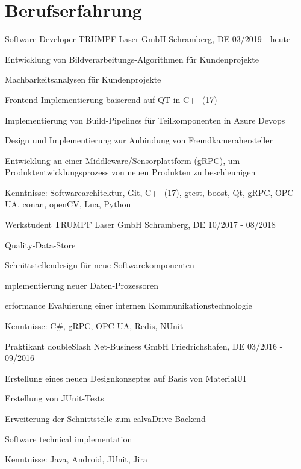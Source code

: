 \vspace{-\acvSectionTopSkip}
\section{Berufserfahrung}
\cventry
{Software-Developer} %
{TRUMPF Laser GmbH} %
{Schramberg, DE} %
{03/2019 - heute} %
\begin{cvitems}
\item {Entwicklung von Bildverarbeitungs-Algorithmen für Kundenprojekte}
\item {Machbarkeitsanalysen für Kundenprojekte}
\item {Frontend-Implementierung baiserend auf QT in C++(17)}
\item {Implementierung von Build-Pipelines für Teilkomponenten in Azure Devops}
\item {Design und Implementierung zur Anbindung von Fremdkamerahersteller}
\item {Entwicklung an einer Middleware/Sensorplattform (gRPC), um Produktentwicklungsprozess von neuen Produkten zu beschleunigen}
\item{Kenntnisse: Softwarearchitektur, Git, C++(17), gtest, boost, Qt, gRPC, OPC-UA, conan, openCV, Lua, Python }
\end{cvitems}

\cventry
{Werkstudent} %
{TRUMPF Laser GmbH} %
{Schramberg, DE} %
{10/2017 - 08/2018} %
\begin{cvitems}
\item {Quality-Data-Store}
\item {Schnittstellendesign für neue Softwarekomponenten}
\item {mplementierung neuer Daten-Prozessoren}
\item {erformance Evaluierung einer internen Kommunikationstechnologie}
\item{Kenntnisse: C\#, gRPC, OPC-UA, Redis, NUnit}
\end{cvitems}

\cventry
{Praktikant} %
{doubleSlash Net-Business GmbH} %
{Friedrichshafen, DE} %
{03/2016 - 09/2016} %
\begin{cvitems}
\item {Erstellung eines neuen Designkonzeptes auf Basis von MaterialUI}
\item {Erstellung von JUnit-Tests}
\item {Erweiterung der Schnittstelle zum calvaDrive-Backend}
\item {Software technical implementation}
\item {Kenntnisse: Java, Android, JUnit, Jira}
\end{cvitems}

